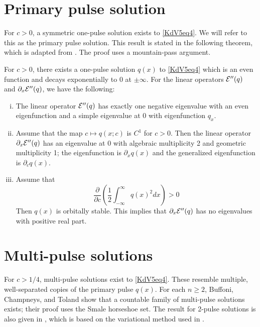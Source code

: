 \documentclass[thesis.tex]{subfiles}
\begin{document}
\section{Primary pulse solution}

For $c > 0$, a symmetric one-pulse solution exists to \cref{KdV5eq4}. We will refer to this as the primary pulse solution. This result is stated in the following theorem, which is adapted from \cite[Theorem 2.1]{Pelinovsky2007}. The proof uses a mountain-pass argument.

\begin{theorem}\label{KdV1pulse}
For $c > 0$, there exists a one-pulse solution $q(x)$ to \cref{KdV5eq4} which is an even function and decays exponentially to 0 at $\pm \infty$. For the linear operators $\mathcal{E}''(q)$ and $\partial_x \mathcal{E}''(q)$, we have the following:
\begin{enumerate}[(i)]
\item The linear operator $\mathcal{E}''(q)$ has exactly one negative eigenvalue with an even eigenfunction and a simple eigenvalue at 0 with eigenfunction $q_x$.
\item Assume that the map $c \mapsto q(x; c)$ is $C^1$ for $c > 0$. Then the linear operator $\partial_x \mathcal{E}''(q)$ has an eigenvalue at 0 with algebraic multiplicity 2 and geometric multiplicity 1; the eigenfunction is $\partial_x q(x)$ and the generalized eigenfunction is $\partial_c q(x)$. 
\item Assume that 
\[
\frac{\partial}{\partial c} \left( \frac{1}{2} \int_{-\infty}^\infty q(x)^2 dx \right) > 0
\]
Then $q(x)$ is orbitally stable. This implies that $\partial_x \mathcal{E}''(q)$ has no eigenvalues with positive real part.
\end{enumerate}
\end{theorem}

\section{Multi-pulse solutions}

For $c > 1/4$, multi-pulse solutions exist to \cref{KdV5eq4}. These resemble multiple, well-separated copies of the primary pulse $q(x)$. For each $n \geq 2$, Buffoni, Champneys, and Toland \cite{Buffoni1996} show that a countable family of multi-pulse solutions exists; their proof uses the Smale horseshoe set. The result for 2-pulse solutions is also given in \cite[Theorem 2.2]{Pelinovsky2007}, which is based on the variational method used in \cite{Buffoni1996}. 
\end{document}
